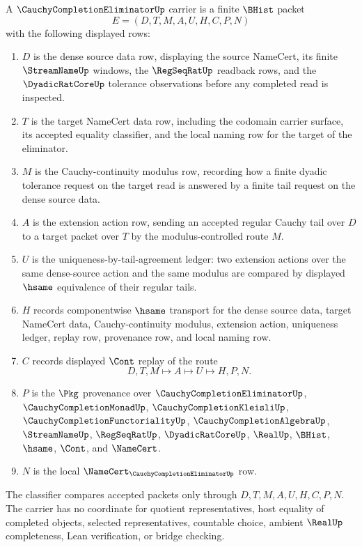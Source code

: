 \begin{definition}
\label{def:cauchy-completion-eliminator-carrier}
A $\CauchyCompletionEliminatorUp$ carrier is a finite $\BHist$ packet
$$
E=(D,T,M,A,U,H,C,P,N)
$$
with the following displayed rows:
\begin{enumerate}
\item $D$ is the dense source data row, displaying the source NameCert, its finite $\StreamNameUp$ windows, the $\RegSeqRatUp$ readback rows, and the $\DyadicRatCoreUp$ tolerance observations before any completed read is inspected.
\item $T$ is the target NameCert data row, including the codomain carrier surface, its accepted equality classifier, and the local naming row for the target of the eliminator.
\item $M$ is the Cauchy-continuity modulus row, recording how a finite dyadic tolerance request on the target read is answered by a finite tail request on the dense source data.
\item $A$ is the extension action row, sending an accepted regular Cauchy tail over $D$ to a target packet over $T$ by the modulus-controlled route $M$.
\item $U$ is the uniqueness-by-tail-agreement ledger: two extension actions over the same dense-source action and the same modulus are compared by displayed $\hsame$ equivalence of their regular tails.
\item $H$ records componentwise $\hsame$ transport for the dense source data, target NameCert data, Cauchy-continuity modulus, extension action, uniqueness ledger, replay row, provenance row, and local naming row.
\item $C$ records displayed $\Cont$ replay of the route
$$
D,T,M \longmapsto A \longmapsto U \longmapsto H,P,N .
$$
\item $P$ is the $\Pkg$ provenance over $\CauchyCompletionEliminatorUp$, $\CauchyCompletionMonadUp$, $\CauchyCompletionKleisliUp$, $\CauchyCompletionFunctorialityUp$, $\CauchyCompletionAlgebraUp$, $\StreamNameUp$, $\RegSeqRatUp$, $\DyadicRatCoreUp$, $\RealUp$, $\BHist$, $\hsame$, $\Cont$, and $\NameCert$.
\item $N$ is the local $\NameCert_{\CauchyCompletionEliminatorUp}$ row.
\end{enumerate}
The classifier compares accepted packets only through $D,T,M,A,U,H,C,P,N$. The carrier has no coordinate for quotient representatives, host equality of completed objects, selected representatives, countable choice, ambient $\RealUp$ completeness, Lean verification, or bridge checking.
\end{definition}

